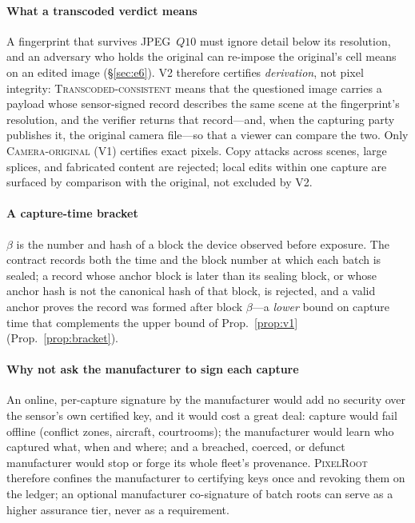 \documentclass[journal]{IEEEtran}
\newcommand{\pr}{\textup{\textsc{PixelRoot}}}
\begin{document}
\paragraph{What a transcoded verdict means}
A fingerprint that survives JPEG~$Q10$ must ignore detail below its resolution,
and an adversary who holds the original can re-impose the original's cell means
on an edited image (\S\ref{sec:e6}). V2 therefore certifies \emph{derivation},
not pixel integrity: \textsc{Transcoded-consistent} means that the questioned
image carries a payload whose sensor-signed record describes the same scene at
the fingerprint's resolution, and the verifier returns that record---and, when
the capturing party publishes it, the original camera file---so that a viewer
can compare the two. Only \textsc{Camera-original} (V1) certifies exact pixels.
Copy attacks across scenes, large splices, and fabricated content are rejected;
local edits within one capture are surfaced by comparison with the original, not
excluded by V2.

\paragraph{A capture-time bracket}
$\beta$ is the number and hash of a block the device observed before exposure.
The contract records both the time and the block number at which each batch is
sealed; a record whose anchor block is later than its sealing block, or whose
anchor hash is not the canonical hash of that block, is rejected, and a valid
anchor proves the record was formed after block $\beta$---a \emph{lower} bound on
capture time that complements the upper bound of Prop.~\ref{prop:v1}
(Prop.~\ref{prop:bracket}).

\paragraph{Why not ask the manufacturer to sign each capture}
An online, per-capture signature by the manufacturer would add no security over
the sensor's own certified key, and it would cost a great deal: capture would
fail offline (conflict zones, aircraft, courtrooms); the manufacturer would learn
who captured what, when and where; and a breached, coerced, or defunct
manufacturer would stop or forge its whole fleet's provenance. \pr{} therefore
confines the manufacturer to certifying keys once and revoking them on the
ledger; an optional manufacturer co-signature of batch roots can serve as a
higher assurance tier, never as a requirement.
\end{document}
